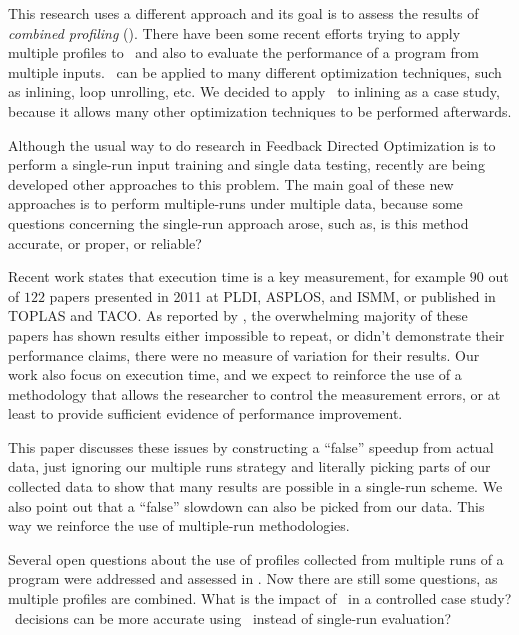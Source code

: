 This research uses a different approach and its goal is to assess the results of {\em combined profiling} (\CP). There have been some recent efforts trying to apply multiple profiles to \FDO\, and also to evaluate the performance of a program from multiple inputs. \CP\ can be applied to many different optimization techniques, such as inlining, loop unrolling, etc. We decided to apply \CP\ to inlining as a case study, because it allows many other optimization techniques to be performed afterwards.


Although the usual way to do research in Feedback Directed Optimization is to perform a single-run input training and single data testing, recently are being developed other approaches to this problem. The main goal of these new approaches is to perform multiple-runs under multiple data, because some questions concerning the single-run approach arose, such as, is this method accurate, or proper, or reliable?

Recent work \cite{Kalibera2013} states that execution time is a key measurement, for example $90$ out of $122$ papers presented in 2011 at PLDI, ASPLOS, and ISMM, or published in TOPLAS and TACO. As reported by \cite{Kalibera2013}, the overwhelming majority of these papers has shown results either impossible to repeat, or didn't demonstrate their performance claims, there were no measure of variation for their results. Our work also focus on execution time, and we expect to reinforce the use of a methodology that allows the researcher to control the measurement errors, or at least to provide sufficient evidence of performance improvement.


This paper discusses these issues by constructing a ``false'' speedup from actual data, just ignoring our multiple runs strategy and literally picking parts of our collected data to show that many results are possible in a single-run scheme. We also point out that a ``false'' slowdown can also be picked from our data. This way we reinforce the use of multiple-run methodologies.


Several open questions about the use of profiles collected from multiple runs of a program were addressed and assessed in \cite{BerubeISPASS12}. Now there are still some questions, as multiple profiles are combined. What is the impact of \CP\ in a controlled case study? \FDO\ decisions can be more accurate using \CP\ instead of single-run evaluation?

